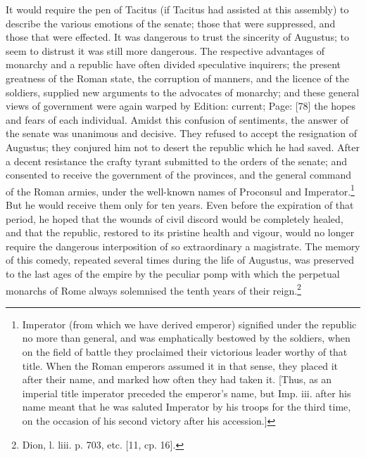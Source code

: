 It would require the pen of Tacitus (if Tacitus had assisted at this assembly) to describe the various emotions of the senate; those that were suppressed, and those that were effected. It was dangerous to trust the sincerity of Augustus; to seem to distrust it was still more dangerous. The respective advantages of monarchy and a republic have often divided speculative inquirers; the present greatness of the Roman state, the corruption of manners, and the licence of the soldiers, supplied new arguments to the advocates of monarchy; and these general views of government were again warped by Edition: current; Page: [78] the hopes and fears of each individual. Amidst this confusion of sentiments, the answer of the senate was unanimous and decisive. They refused to accept the resignation of Augustus; they conjured him not to desert the republic which he had saved. After a decent resistance the crafty tyrant submitted to the orders of the senate; and consented to receive the government of the provinces, and the general command of the Roman armies, under the well-known names of Proconsul and Imperator.\footnote{Imperator (from which we have derived emperor) signified under the republic no more than general, and was emphatically bestowed by the soldiers, when on the field of battle they proclaimed their victorious leader worthy of that title. When the Roman emperors assumed it in that sense, they placed it after their name, and marked how often they had taken it. [Thus, as an imperial title imperator preceded the emperor\texthebrew{}’s name, but Imp. iii. after his name meant that he was saluted Imperator by his troops for the third time, on the occasion of his second victory after his accession.]} But he would receive them only for ten years. Even before the expiration of that period, he hoped that the wounds of civil discord would be completely healed, and that the republic, restored to its pristine health and vigour, would no longer require the dangerous interposition of so extraordinary a magistrate. The memory of this comedy, repeated several times during the life of Augustus, was preserved to the last ages of the empire by the peculiar pomp with which the perpetual monarchs of Rome always solemnised the tenth years of their reign.\footnote{Dion, l. liii. p. 703, etc. [11, cp. 16].}

